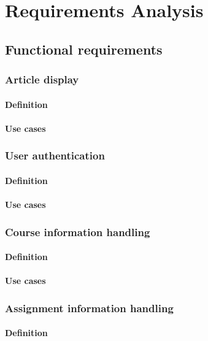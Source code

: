 
\chapter{Requirements Analysis}

\section{Functional requirements}

\subsection{Article display}
\subsubsection{Definition}
\subsubsection{Use cases}

\subsection{User authentication}
\subsubsection{Definition}
\subsubsection{Use cases}

\subsection{Course information handling}
\subsubsection{Definition}
\subsubsection{Use cases}

\subsection{Assignment information handling}
\subsubsection{Definition}
